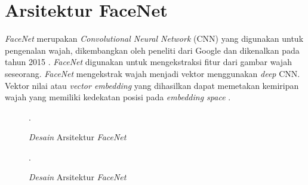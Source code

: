 

\section{Arsitektur FaceNet}
\par \textit{FaceNet} merupakan \textit{Convolutional Neural Network} (CNN) yang digunakan untuk pengenalan wajah, dikembangkan oleh peneliti dari Google dan dikenalkan pada tahun 2015 \citep{jose2019}. \textit{FaceNet} digunakan untuk mengekstraksi fitur dari gambar wajah seseorang. \textit{FaceNet} mengekstrak wajah menjadi vektor menggunakan \textit{deep} CNN. Vektor nilai atau \textit{vector embedding} yang dihasilkan dapat memetakan kemiripan wajah yang memiliki kedekatan posisi pada \textit{embedding space} \citep{rajagede2021}.

\begin{figure}[H]
\centering
{}
\caption{\textit{Desain} Arsitektur \textit{FaceNet}}.
\label{dig_facenet}
\end{figure}

\begin{figure}[H]
\centering
{}
\caption{\textit{Desain} Arsitektur \textit{FaceNet}}.
\label{dig_facenet}
\end{figure}


